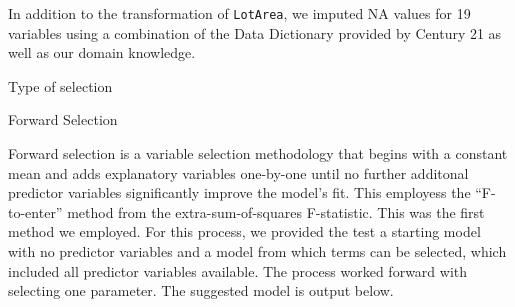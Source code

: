 \documentclass[american,]{article}
\theoremstyle{definition}
\theoremstyle{definition}
\theoremstyle{definition}
\theoremstyle{remark}
\begin{document}
In addition to the transformation of \texttt{LotArea}, we imputed NA
values for 19 variables using a combination of the Data Dictionary
provided by Century 21 as well as our domain knowledge.

Type of selection

Forward Selection

Forward selection is a variable selection methodology that begins with a
constant mean and adds explanatory variables one-by-one until no further
additonal predictor variables significantly improve the model's fit.
This employess the ``F-to-enter'' method from the extra-sum-of-squares
F-statistic. This was the first method we employed. For this process, we
provided the test a starting model with no predictor variables and a
model from which terms can be selected, which included all predictor
variables available. The process worked forward with selecting one
parameter. The suggested model is output below.
\end{document}
